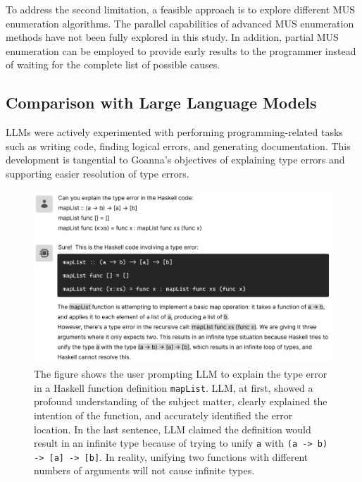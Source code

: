 \documentclass[pdflatex,lineno,sn-nature,Numbered]{sn-jnl}%
\begin{document}
To address the second limitation, a feasible approach is to explore different MUS enumeration algorithms. The parallel capabilities of advanced MUS enumeration methods \cite{Zhao2016-bu, Bendik2020-pz} have not been fully explored in this study. In addition, partial MUS enumeration \cite{Previti2013-mr, Liffiton2016-xi} can be employed to provide early results to the programmer instead of waiting for the complete list of possible causes.



\subsection{Comparison with Large Language Models} \label{sec:llm}
    
LLMs were actively experimented with performing programming-related tasks such as writing code, finding logical errors, and generating documentation.  This development is tangential to Goanna's objectives of explaining type errors and supporting easier resolution of type errors. 

\begin{figure}[hbt]
  \includegraphics[width=\linewidth]{images/LLM.pdf}
  \caption[LLM explaining a type error; it began very accurate, then went on to give incorrect and contradicting analysis]{\label{fig:llm}
  The figure shows the user prompting LLM to explain the type error in a Haskell function definition \texttt{mapList}. LLM, at first, showed a profound understanding of the subject matter, clearly explained the intention of the function, and accurately identified the error location. In the last sentence, LLM claimed the definition would result in an infinite type because of trying to unify \texttt{a} with \texttt{(a -> b) -> [a] -> [b]}. In reality, unifying two functions with different numbers of arguments will not cause infinite types. 
    }
\end{figure}
\end{document}
